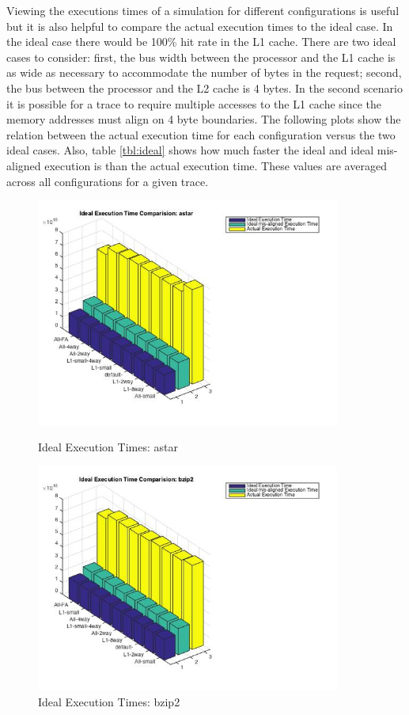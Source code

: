 \documentclass[11pt,titlepage]{article}
\begin{document}
    Viewing the executions times of a simulation for different configurations is useful but it is also helpful to compare the actual execution times to the ideal case. In the ideal case there would be 100\% hit rate in the L1 cache. There are two ideal cases to consider: first, the bus width between the processor and the L1 cache is as wide as necessary to accommodate the number of bytes in the request; second, the bus between the processor and the L2 cache is 4 bytes. In the second scenario it is possible for a trace to require multiple accesses to the L1 cache since the memory addresses must align on 4 byte boundaries. The following plots show the relation between the actual execution time for each configuration versus the two ideal cases. Also, table \ref{tbl:ideal} shows how much faster the ideal and ideal mis-aligned execution is than the actual execution time. These values are averaged across all configurations for a given trace.
    \begin{figure}[H]
        \centering
        \begin{minipage}{.5\textwidth}
            \centering
            \includegraphics[width=10cm]{idealAstar}
            \caption{Ideal Execution Times: astar}
            \label{fig:idealA}
        \end{minipage}%
        \begin{minipage}{.5\textwidth}
            \centering
            \includegraphics[width=10cm]{idealBzip2}
            \caption{Ideal Execution Times: bzip2}
            \label{fig:idealB}
        \end{minipage}
    \end{figure}
\end{document}
